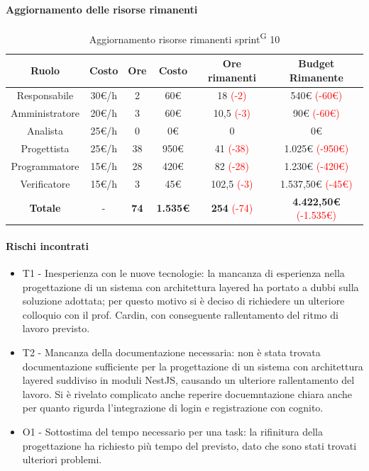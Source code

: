 \documentclass[a4paper, 11pt]{article}
\newcommand{\subsubsubsection}[1]{\paragraph{#1}}
\renewcommand{\arraystretch}{1.4} %
\begin{document}
\subsubsubsection{Aggiornamento delle risorse rimanenti}
\begin{table}[H]
	\centering
	\renewcommand{\arraystretch}{1.5}
	
	\begin{tabular}{|c|c|c|c|c|c|}
    \hline
    \textcolor{AccentColor}{\textbf{Ruolo}} &
    \textcolor{AccentColor}{\textbf{Costo}} &
    \textcolor{AccentColor}{\textbf{Ore}} &
    \textcolor{AccentColor}{\textbf{Costo}} &
    \textcolor{AccentColor}{\textbf{Ore rimanenti}} &
    \textcolor{AccentColor}{\textbf{Budget Rimanente}} \\ \hline
    
    Responsabile   & 30€/h & 2  & 60€    & 18 \textcolor{red}{(-2)}    & 540€ \textcolor{red}{(-60€)}     \\ \hline
    Amministratore & 20€/h & 3  & 60€    & 10,5 \textcolor{red}{(-3)}  & 90€ \textcolor{red}{(-60€)}      \\ \hline
    Analista       & 25€/h & 0  & 0€     & 0                           & 0€                               \\ \hline
    Progettista    & 25€/h & 38 & 950€   & 41 \textcolor{red}{(-38)}   & 1.025€ \textcolor{red}{(-950€)}  \\ \hline
    Programmatore  & 15€/h & 28 & 420€   & 82 \textcolor{red}{(-28)}   & 1.230€ \textcolor{red}{(-420€)}  \\ \hline
    Verificatore   & 15€/h & 3  & 45€    & 102,5 \textcolor{red}{(-3)} & 1.537,50€ \textcolor{red}{(-45€)}\\ \hline
    \textbf{Totale}& -     & \textbf{74}& \textbf{1.535€}& \textbf{254} \textcolor{red}{(-74)} & \textbf{4.422,50€} \textcolor{red}{(-1.535€)} \\ \hline
\end{tabular}
	\caption{Aggiornamento risorse rimanenti sprint\textsuperscript{G} 10}
\end{table}

\subsubsubsection{Rischi incontrati}
\begin{itemize}
	\item T1 - Inesperienza con le nuove tecnologie: la mancanza di esperienza nella progettazione di un sistema con architettura layered ha portato a dubbi sulla soluzione adottata; per questo motivo si è deciso di richiedere un ulteriore colloquio con il prof. Cardin, con conseguente rallentamento del ritmo di lavoro previsto.
	\item T2 - Mancanza della documentazione necessaria: non è stata trovata documentazione sufficiente per la progettazione di un sistema con architettura layered suddiviso in moduli NestJS, causando un ulteriore rallentamento del lavoro. Si è rivelato complicato anche reperire docuemntazione chiara anche per quanto rigurda l'integrazione di login e registrazione con cognito.
	\item O1 - Sottostima del tempo necessario per una task: la rifinitura della progettazione ha richiesto più tempo del previsto, dato che sono stati trovati ulteriori problemi.
\end{itemize}
\end{document}
